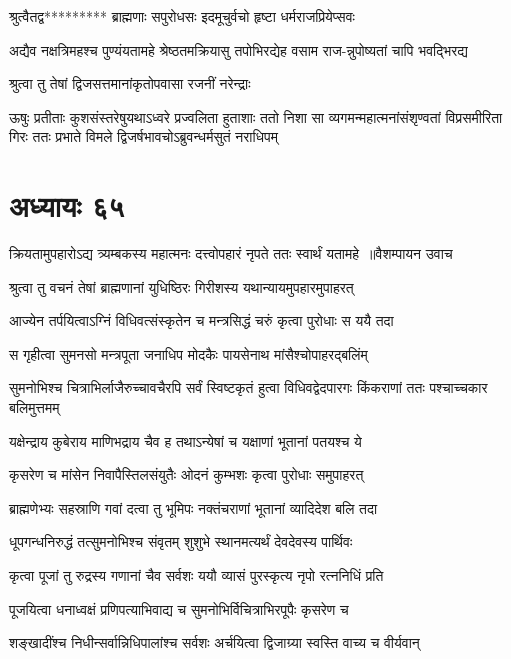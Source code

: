 \twolineshloka
{श्रुत्वैतद्व********* ब्राह्मणाः सपुरोधसः}
{इदमूचुर्वचो हृष्टा धर्मराजप्रियेप्सवः}


\twolineshloka
{अद्यैव नक्षत्रिमहश्च पुण्यंयतामहे श्रेष्ठतमक्रियासु}
{तपोभिरद्येह वसाम राज-न्नुपोष्यतां चापि भवद्भिरद्य}


\twolineshloka
{श्रुत्वा तु तेषां द्विजसत्तमानांकृतोपवासा रजनीं नरेन्द्राः}
{}


ऊषुः प्रतीताः कुशसंस्तरेषुयथाऽध्वरे प्रज्वलिता हुताशाः
\twolineshloka
{ततो निशा सा व्यगमन्महात्मनांसंशृण्वतां विप्रसमीरिता गिरः}
{ततः प्रभाते विमले द्विजर्षभावचोऽब्रुवन्धर्मसुतं नराधिपम्}


\chapter{अध्यायः ६५}
\threelineshloka
{क्रियतामुपहारोऽद्य त्र्यम्बकस्य महात्मनः}
{दत्त्वोपहारं नृपते ततः स्वार्थं यतामहे ॥वैशम्पायन उवाच}
{}


\twolineshloka
{श्रुत्वा तु वचनं तेषां ब्राह्मणानां युधिष्ठिरः}
{गिरीशस्य यथान्यायमुपहारमुपाहरत्}


\twolineshloka
{आज्येन तर्पयित्वाऽग्निं विधिवत्संस्कृतेन च}
{मन्त्रसिद्धं चरुं कृत्वा पुरोधाः स ययै तदा}


\twolineshloka
{स गृहीत्वा सुमनसो मन्त्रपूता जनाधिप}
{मोदकैः पायसेनाथ मांसैश्चोपाहरद्बलिंम्}


\threelineshloka
{सुमनोभिश्च चित्राभिर्लाजैरुच्चावचैरपि}
{सर्वं स्विष्टकृतं हुत्वा विधिवद्वेदपारगः}
{किंकराणां ततः पश्चाच्चकार बलिमुत्तमम्}


\twolineshloka
{यक्षेन्द्राय कुबेराय माणिभद्राय चैव ह}
{तथाऽन्येषां च यक्षाणां भूतानां पतयश्च ये}


\twolineshloka
{कृसरेण च मांसेन निवापैस्तिलसंयुतैः}
{ओदनं कुम्भशः कृत्वा पुरोधाः समुपाहरत्}


\twolineshloka
{ब्राह्मणेभ्यः सहस्राणि गवां दत्वा तु भूमिपः}
{नक्तंचराणां भूतानां व्यादिदेश बलि तदा}


\twolineshloka
{धूपगन्धनिरुद्धं तत्सुमनोभिश्च संवृतम्}
{शुशुभे स्थानमत्यर्थं देवदेवस्य पार्थिवः}


\twolineshloka
{कृत्वा पूजां तु रुद्रस्य गणानां चैव सर्वशः}
{ययौ व्यासं पुरस्कृत्य नृपो रत्ननिधिं प्रति}


\twolineshloka
{पूजयित्वा धनाध्वक्षं प्रणिपत्याभिवाद्य च}
{सुमनोभिर्विचित्राभिरपूपैः कृसरेण च}


\twolineshloka
{शङ्खादींश्च निधीन्सर्वान्निधिपालांश्च सर्वशः}
{अर्चयित्वा द्विजाग्र्या स्वस्ति वाच्य च वीर्यवान्}


